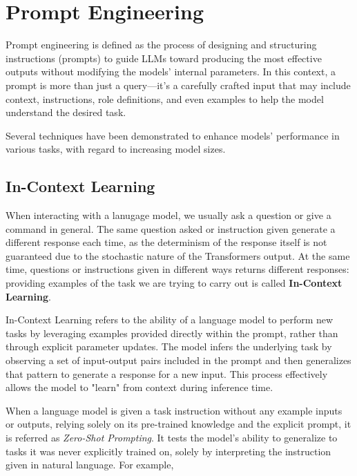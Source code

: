 \section{Prompt Engineering}
\label{sec:prompt-engineering}

Prompt engineering is defined as the process of designing and structuring instructions (prompts) to guide LLMs toward producing the most effective outputs without modifying the models’ internal parameters. In this context, a prompt is more than just a query—it’s a carefully crafted input that may include context, instructions, role definitions, and even examples to help the model understand the desired task.\cite{sahoo2024systematicsurveypromptengineering}

Several techniques have been demonstrated to enhance models' performance in various tasks, with regard to increasing model sizes.\cite{brown2020language}


\subsection{In-Context Learning}
\label{sec:in-context-learning}

When interacting with a lanugage model, we usually ask a question or give a command in general. The same question asked or instruction given generate a different response each time, as the determinism of the response itself is not guaranteed due to the stochastic nature of the Transformers output. At the same time, questions or instructions given in different ways returns different responses: providing examples of the task we are trying to carry out is called \textbf{In-Context Learning}.

In-Context Learning refers to the ability of a language model to perform new tasks by leveraging examples provided directly within the prompt, rather than through explicit parameter updates. The model infers the underlying task by observing a set of input-output pairs included in the prompt and then generalizes that pattern to generate a response for a new input. This process effectively allows the model to "learn" from context during inference time.

When a language model is given a task instruction without any example inputs or outputs, relying solely on its pre-trained knowledge and the explicit prompt, it is referred as \textit{Zero-Shot Prompting}.
It tests the model’s ability to generalize to tasks it was never explicitly trained on, solely by interpreting the instruction given in natural language. For example,

